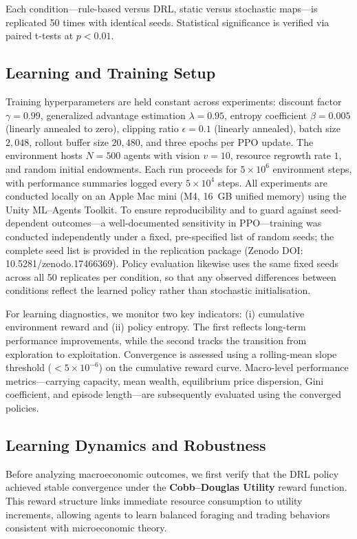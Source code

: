 \documentclass[pdflatex,sn-mathphys-num]{sn-jnl}%
\theoremstyle{thmstyleone}%
\theoremstyle{thmstyletwo}%
\theoremstyle{thmstylethree}%
\begin{document}
Each condition---rule-based versus DRL, static versus stochastic maps---is replicated 50 times with identical seeds.  
Statistical significance is verified via paired t-tests at \(p<0.01\).

\subsection{Learning and Training Setup}
\label{sec:training}
Training hyperparameters are held constant across experiments: discount factor $\gamma = 0.99$, generalized advantage estimation $\lambda = 0.95$, entropy coefficient $\beta = 0.005$ (linearly annealed to zero), clipping ratio $\epsilon = 0.1$ (linearly annealed), batch size $2{,}048$, rollout buffer size $20{,}480$, and three epochs per PPO update.  
The environment hosts $N = 500$ agents with vision $v = 10$, resource regrowth rate $1$, and random initial endowments.  
Each run proceeds for $5\times10^{6}$ environment steps, with performance summaries logged every $5\times10^{4}$ steps.  
All experiments are conducted locally on an Apple Mac mini (M4, 16~GB unified memory) using the Unity ML--Agents Toolkit.
To ensure reproducibility and to guard against seed-dependent outcomes---a well-documented sensitivity in PPO---training was conducted independently under a fixed, pre-specified list of random seeds; the complete seed list is provided in the replication package (Zenodo DOI: 10.5281/zenodo.17466369).
Policy evaluation likewise uses the same fixed seeds across all 50 replicates per condition, so that any observed differences between conditions reflect the learned policy rather than stochastic initialisation.

For learning diagnostics, we monitor two key indicators: (i) cumulative environment reward and (ii) policy entropy.  
The first reflects long-term performance improvements, while the second tracks the transition from exploration to exploitation.  
Convergence is assessed using a rolling-mean slope threshold ($<5\times10^{-6}$) on the cumulative reward curve.  
Macro-level performance metrics---carrying capacity, mean wealth, equilibrium price dispersion, Gini coefficient, and episode length---are subsequently evaluated using the converged policies.

\subsection{Learning Dynamics and Robustness}
Before analyzing macroeconomic outcomes, we first verify that the DRL policy achieved stable convergence under the \textbf{Cobb--Douglas Utility} reward function.  
This reward structure links immediate resource consumption to utility increments, allowing agents to learn balanced foraging and trading behaviors consistent with microeconomic theory.
\end{document}

